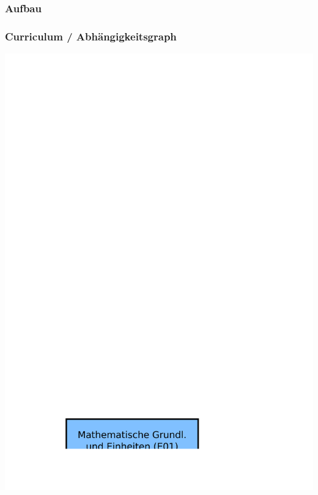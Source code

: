 \subsubsection{Aufbau}

\begin{frame}
    \frametitle{Curriculum / Abhängigkeitsgraph}

    \includegraphics[width=1\textwidth]{o00/Abhaengigkeitsgraph.pdf}

\end{frame}

